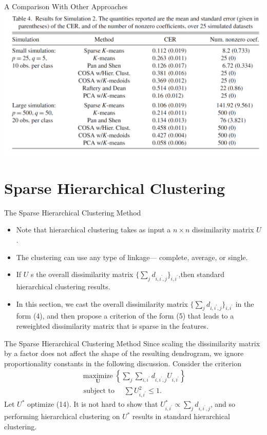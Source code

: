 \documentclass[12pt]{beamer}
\begin{document}
\begin{frame}{A Comparison With Other Approaches}
\includegraphics[scale=0.6]{fig5.png}
\end{frame}

\section{Sparse Hierarchical Clustering}
\begin{frame}{The Sparse Hierarchical Clustering Method}
\begin{itemize}
\item Note that hierarchical clustering takes as input a $n \times n$ dissimilarity matrix $U$.
\item The clustering can use any type of linkage—
complete, average, or single.
\item If $U$ s the overall dissimilarity
matrix $\{ \sum_{j} d_{i,i^{'},j}\}_{i,i^{'}}$,then standard hierarchical clustering results.
\item In this section, we cast the overall dissimilarity matrix $\{ \sum_{j} d_{i,i^{'},j}\}_{i,i^{'}}$ in the form (4), and then propose a criterion of
the form (5) that leads to a reweighted dissimilarity matrix that
is sparse in the features. 
\end{itemize}
\end{frame}

\begin{frame}{The Sparse Hierarchical Clustering Method}
Since scaling the dissimilarity matrix by a factor does not
affect the shape of the resulting dendrogram, we ignore proportionality
constants in the following discussion. Consider the
criterion
\begin{equation}\tag{14}
\begin{array}{c}
\underset{\mathbf{U}}{\operatorname{maximize}}\left\{\sum_{j} \sum_{i, i^{\prime}} d_{i, i^{\prime}, j} U_{i, i^{\prime}}\right\} \\
\text { subject to } \quad \sum U_{i, i^{\prime}}^{2} \leq 1.
\end{array}
\end{equation}
Let $U^*$ optimize (14). It is not hard to show that $U^{*}_{i,i^{'}}\propto \sum_{j} d_{i, i^{\prime}, j}$, and so performing hierarchical clustering on $U^*$ results in standard
hierarchical clustering.
\end{frame}
\end{document}

